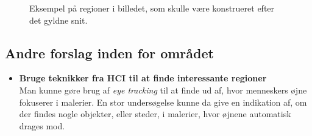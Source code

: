 {\begin{figure}[!h]
    \centering
    \caption[]{Eksempel på regioner i billedet, som skulle være
    konstrueret efter det gyldne snit.}
    \label{monalisa_fake}
\end{figure}


\subsection{Andre forslag inden for området}
\begin{itemize}
    \item \textbf{Bruge teknikker fra HCI til at finde interessante regioner}\\
        Man kunne gøre brug af \emph{eye tracking} til at finde ud af,
        hvor menneskers øjne fokuserer i malerier. En stor undersøgelse
        kunne da give en indikation af, om der findes nogle objekter,
        eller steder, i malerier, hvor øjnene automatisk drages mod.
\end{itemize}

}


